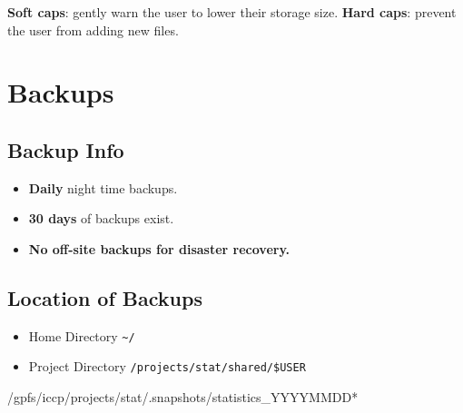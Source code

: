 \documentclass[
  letterpaper,
  DIV=11,
  numbers=noendperiod]{scrreport}
\newenvironment{Shaded}{\begin{snugshade}}{\end{snugshade}}
\newcommand{\ExtensionTok}[1]{\textcolor[rgb]{0.00,0.23,0.31}{#1}}
\newcommand{\VariableTok}[1]{\textcolor[rgb]{0.07,0.07,0.07}{#1}}
\providecommand{\tightlist}{%
  \setlength{\itemsep}{0pt}\setlength{\parskip}{0pt}}\usepackage{longtable,booktabs,array}
\begin{document}
\textbf{Soft caps}: gently warn the user to lower their storage size.
\textbf{Hard caps}: prevent the user from adding new files.

\hypertarget{backups}{%
\section{Backups}\label{backups}}

\hypertarget{backup-info}{%
\subsection{Backup Info}\label{backup-info}}

\begin{itemize}
\tightlist
\item
  \textbf{Daily} night time backups.
\item
  \textbf{30 days} of backups exist.
\item
  \textbf{No off-site backups for disaster recovery.}
\end{itemize}

\hypertarget{location-of-backups}{%
\subsection{Location of Backups}\label{location-of-backups}}

\begin{itemize}
\tightlist
\item
  Home Directory \texttt{\textasciitilde{}/}
\end{itemize}

\begin{Shaded}
\end{Shaded}

\begin{itemize}
\tightlist
\item
  Project Directory \texttt{/projects/stat/shared/\$USER}
\end{itemize}

\begin{Shaded}
\begin{Highlighting}[]
\ExtensionTok{/gpfs/iccp/projects/stat/.snapshots/statistics\_YYYYMMDD*}
\end{Highlighting}
\end{Shaded}
\end{document}
